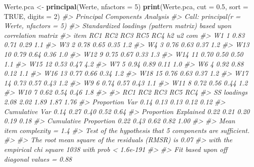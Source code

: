 \documentclass[12pt,ngerman,]{book}
\makeatletter
\newenvironment{Shaded}{\begin{snugshade}}{\end{snugshade}}
\newcommand{\KeywordTok}[1]{\textcolor[rgb]{0.13,0.29,0.53}{\textbf{{#1}}}}
\newcommand{\DataTypeTok}[1]{\textcolor[rgb]{0.13,0.29,0.53}{{#1}}}
\newcommand{\DecValTok}[1]{\textcolor[rgb]{0.00,0.00,0.81}{{#1}}}
\newcommand{\FloatTok}[1]{\textcolor[rgb]{0.00,0.00,0.81}{{#1}}}
\newcommand{\StringTok}[1]{\textcolor[rgb]{0.31,0.60,0.02}{{#1}}}
\newcommand{\CommentTok}[1]{\textcolor[rgb]{0.56,0.35,0.01}{\textit{{#1}}}}
\newcommand{\OtherTok}[1]{\textcolor[rgb]{0.56,0.35,0.01}{{#1}}}
\newcommand{\NormalTok}[1]{{#1}}
\newenvironment{kframe}{%
\medskip{}
\setlength{\fboxsep}{.8em}
 \def\at@end@of@kframe{}%
 \ifinner\ifhmode%
  \def\at@end@of@kframe{\end{minipage}}%
  \begin{minipage}{\columnwidth}%
 \fi\fi%
 \def\FrameCommand##1{\hskip\@totalleftmargin \hskip-\fboxsep
 \colorbox{shadecolor}{##1}\hskip-\fboxsep
     \hskip-\linewidth \hskip-\@totalleftmargin \hskip\columnwidth}%
 \MakeFramed {\advance\hsize-\width
   \@totalleftmargin\z@ \linewidth\hsize
   \@setminipage}}%
 {\par\unskip\endMakeFramed%
 \at@end@of@kframe}
\renewenvironment{Shaded}{\begin{kframe}}{\end{kframe}}
\makeatother
\begin{document}
\begin{Shaded}
\begin{Highlighting}[]
\NormalTok{Werte.pca <-}\StringTok{ }\KeywordTok{principal}\NormalTok{(Werte, }\DataTypeTok{nfactors =} \DecValTok{5}\NormalTok{)}
\KeywordTok{print}\NormalTok{(Werte.pca, }\DataTypeTok{cut =} \FloatTok{0.5}\NormalTok{, }\DataTypeTok{sort =} \OtherTok{TRUE}\NormalTok{, }\DataTypeTok{digits =} \DecValTok{2}\NormalTok{)}
\CommentTok{#> Principal Components Analysis}
\CommentTok{#> Call: principal(r = Werte, nfactors = 5)}
\CommentTok{#> Standardized loadings (pattern matrix) based upon correlation matrix}
\CommentTok{#>     item   RC1   RC2   RC3   RC5   RC4   h2   u2 com}
\CommentTok{#> W1     1  0.83                         0.71 0.29 1.1}
\CommentTok{#> W3     2  0.78                         0.65 0.35 1.2}
\CommentTok{#> W4     3  0.76                         0.63 0.37 1.2}
\CommentTok{#> W13   10        0.79                   0.64 0.36 1.0}
\CommentTok{#> W12    9        0.75                   0.67 0.33 1.3}
\CommentTok{#> W14   11        0.70                   0.50 0.50 1.1}
\CommentTok{#> W15   12                               0.53 0.47 4.2}
\CommentTok{#> W7     5              0.94             0.89 0.11 1.0}
\CommentTok{#> W6     4              0.92             0.88 0.12 1.1}
\CommentTok{#> W16   13                    0.77       0.66 0.34 1.2}
\CommentTok{#> W18   15                    0.76       0.63 0.37 1.2}
\CommentTok{#> W17   14                    0.73       0.57 0.43 1.2}
\CommentTok{#> W9     6                          0.74 0.57 0.43 1.1}
\CommentTok{#> W11    8                          0.72 0.56 0.44 1.2}
\CommentTok{#> W10    7                          0.62 0.54 0.46 1.8}
\CommentTok{#> }
\CommentTok{#>                        RC1  RC2  RC3  RC5  RC4}
\CommentTok{#> SS loadings           2.08 2.02 1.89 1.87 1.76}
\CommentTok{#> Proportion Var        0.14 0.13 0.13 0.12 0.12}
\CommentTok{#> Cumulative Var        0.14 0.27 0.40 0.52 0.64}
\CommentTok{#> Proportion Explained  0.22 0.21 0.20 0.19 0.18}
\CommentTok{#> Cumulative Proportion 0.22 0.43 0.62 0.82 1.00}
\CommentTok{#> }
\CommentTok{#> Mean item complexity =  1.4}
\CommentTok{#> Test of the hypothesis that 5 components are sufficient.}
\CommentTok{#> }
\CommentTok{#> The root mean square of the residuals (RMSR) is  0.07 }
\CommentTok{#>  with the empirical chi square  1038  with prob <  1.6e-191 }
\CommentTok{#> }
\CommentTok{#> Fit based upon off diagonal values = 0.88}
\end{Highlighting}
\end{Shaded}
\end{document}
